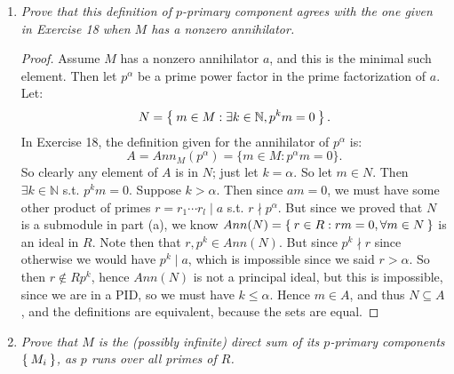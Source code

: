 \documentclass[10pt,oneside,reqno]{amsart}
\theoremstyle{plain}
\newcommand{\sub}{\subseteq}
\newcommand{\n}{\mathbb{N}}
\theoremstyle{definition}
\theoremstyle{remark}
\begin{document}
\begin{enumerate}[label=\arabic*.]
\begin{enumerate}
 \item \textit{Prove that this definition of $p$-primary component agrees with the one given in Exercise 18 when $M$ has a nonzero annihilator. }
 \begin{proof}
 Assume $M$ has a nonzero annihilator $a$, and this is the minimal such element. Then let $p^\alpha$ be a prime power factor in the prime factorization of $a$. Let:
 $$
 N = \Set{m \in M: \exists k\in \n,p^km = 0}.
 $$
 In Exercise 18, the definition given for the annihilator of $p^\alpha$ is: 
 $$
 A = Ann_M(p^\alpha) = \{m \in M: p^\alpha m = 0\}.
 $$
 So clearly any element of $A$ is in $N$; just let $k =\alpha$. So let $m \in N$. Then $\exists k \in \n$ s.t. $p^km = 0$. Suppose $k > \alpha$. Then since $am = 0$, we must have some other product of primes $r = r_1\cdots r_l\mid a$ s.t. $r \nmid p^{\alpha}$. But since we proved that $N$ is a submodule in part (a), we know $Ann(N) = \Set{r \in R: rm = 0,\forall m \in N}$ is an ideal in $R$. Note then that $r,p^k \in Ann(N)$. But since $p^k \nmid r$ since otherwise we would have $p^k \mid a$, which is impossible since we said $r > \alpha$. So then $r \notin Rp^k$, hence $Ann(N)$ is not a principal ideal, but this is impossible, since we are in a PID, so we must have $k \leq \alpha$. Hence $m \in A$, and thus $N \sub A$, and the definitions are equivalent, because the sets are equal. 
 
\begin{comment}
  \textbf{This is sketchy, couldn't you just have that $m$ is also annihilated by some power of some other prime in $a$?}
 
 \textbf{The case of finitely many components (when $M$ is annihilated by a nonzero element of $R$) was considered in class; in fact, the general case can be reduced to it, since $M$ is a torsion module and thus every element of $M$ is contained in an annihilator submodule of some nonzero element of $R$.}

\textbf{The annihilator of a single element $m$ need not be a power of a prime element of $R$ -- a direct sum of submodules is not the union of these submodules, and $m$ does not have to belong to one of these submodules. You have to show that $m$ is a sum, $m=m_{1}+...+m_{k}$ where for each $i$, $m_{i}$ is contained in a primary component of $M$.}
\end{comment}
 \end{proof}
 
 \item \textit{Prove that $M$ is the (possibly infinite) direct sum of its $p$-primary components $\Set{M_i}$, as $p$ runs over all primes of $R$. }
 

\end{enumerate}
\end{enumerate}
\end{document}
